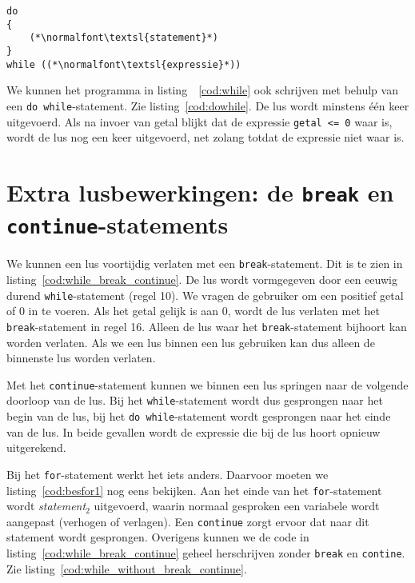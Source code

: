 \begin{lstlisting}[caption=Opzet \texttt{while}-statement.,label=cod:besdowhile1]
do
{
    (*\normalfont\textsl{statement}*)
}
while ((*\normalfont\textsl{expressie}*))
\end{lstlisting}

We kunnen het programma in listing~~\ref{cod:while} ook schrijven met behulp van een \texttt{do while}-statement. Zie listing~\ref{cod:dowhile}. De lus wordt minstens één keer uitgevoerd. Als na invoer van getal blijkt dat de expressie \texttt{getal <= 0} waar is, wordt de lus nog een keer uitgevoerd, net zolang totdat de expressie niet waar is.
 


\section{Extra lusbewerkingen: de \texttt{break} en \texttt{continue}-statements}
We kunnen een lus voortijdig verlaten met een \texttt{break}-statement. Dit is te zien in listing~\ref{cod:while_break_continue}. De lus wordt vormgegeven door een eeuwig durend \texttt{while}-statement (regel 10). We vragen de gebruiker om een positief getal of 0 in te voeren. Als het getal gelijk is aan 0, wordt de lus verlaten met het \texttt{break}-statement in regel 16. Alleen de lus waar het \texttt{break}-statement bijhoort kan worden verlaten. Als we een lus binnen een lus gebruiken kan dus alleen de binnenste lus worden verlaten.

Met het \texttt{continue}-statement kunnen we binnen een lus springen naar de volgende doorloop van de lus. Bij het \texttt{while}-statement wordt dus gesprongen naar het begin van de lus, bij het \texttt{do while}-statement wordt gesprongen naar het einde van de lus. In beide gevallen wordt de expressie die bij de lus hoort opnieuw uitgerekend.

Bij het \texttt{for}-statement werkt het iets anders. Daarvoor moeten we listing~\ref{cod:besfor1} nog eens bekijken. Aan het einde van het \texttt{for}-statement wordt \textsl{statement$_2$} uitgevoerd, waarin normaal gesproken een variabele wordt aangepast (verhogen of verlagen). Een \texttt{continue} zorgt ervoor dat naar dit statement wordt gesprongen. Overigens kunnen we de code in listing~\ref{cod:while_break_continue} geheel herschrijven zonder \texttt{break} en \texttt{contine}. Zie listing~\ref{cod:while_without_break_continue}.

